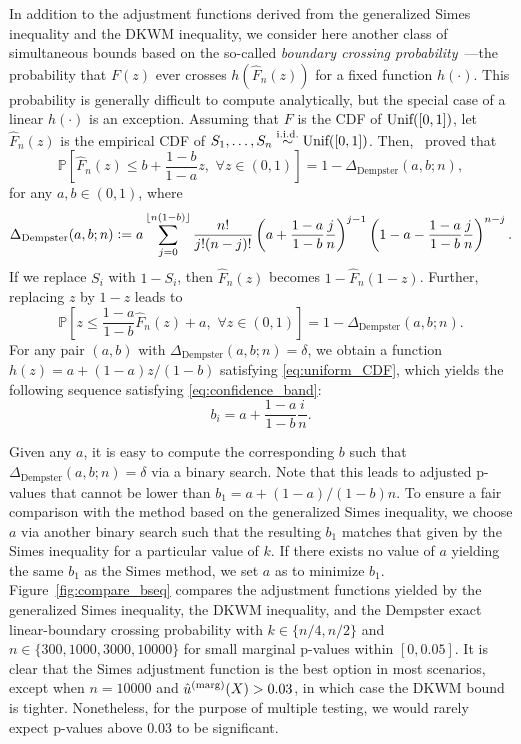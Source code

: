 \documentclass[11pt]{article}
\newcommand{\defeq}{\vcentcolon=}
\newcommand{\Unif}{\textnormal{Unif}}
\def\marg{\textnormal{(marg)}}
\renewcommand{\P}{\mathbb{P}}
\begin{document}
In addition to the adjustment functions derived from the generalized Simes inequality and the DKWM inequality, we consider here another class of simultaneous bounds based on the so-called \emph{boundary crossing probability}~\cite{dempster1959generalized, durbin1973distribution, kotel1983computing, siegmund1986boundary}---the probability that $F(z)$ ever crosses $h(\hat{F}_{n}(z))$ for a fixed function $h(\cdot)$. This probability is generally difficult to compute analytically, but the special case of a linear $h(\cdot)$ is an exception.
Assuming that $F$ is the CDF of $\Unif([0, 1])$, let $\hat{F}_{n}(z)$ is the empirical CDF of $S_{1}, \ldots, S_{n}\stackrel{\mathrm{i.i.d.}}{\sim}\Unif([0, 1])$. Then,~\cite{dempster1959generalized} proved that
\begin{equation*}
  \P\left[ \hat{F}_{n}(z)\le b + \frac{1 - b}{1 - a}z, \,\, \forall z\in (0, 1)\right] = 1 - \Delta_{\mathrm{Dempster}}(a, b; n),
 \end{equation*}
 for any $a, b\in (0, 1)$, where
 \begin{equation}\label{eq:Delta_Dempster}
  \Delta_{\mathrm{Dempster}}(a, b; n) 
  \defeq a\sum_{j=0}^{\lfloor n(1 - b)\rfloor}\frac{n!}{j!(n-j)!}\left( a + \frac{1 - a}{1 - b}\frac{j}{n}\right)^{j-1}\left( 1 - a - \frac{1 - a}{1 - b}\frac{j}{n}\right)^{n-j}.
\end{equation}
 If we replace $S_i$ with $1 - S_i$, then $\hat{F}_{n}(z)$ becomes $1 - \hat{F}_{n}(1 - z)$. Further, replacing $z$ by $1 - z$ leads to
\begin{equation}  \label{eq:dempster}
  \P\left[ z \le \frac{1 - a}{1 - b}\hat{F}_{n}(z) + a, \,\, \forall z\in (0, 1)\right] = 1 - \Delta_{\mathrm{Dempster}}(a, b; n).
\end{equation}
For any pair $(a, b)$ with $\Delta_{\mathrm{Dempster}}(a, b; n) = \delta$, we obtain a function $h(z) = a + (1 - a)z / (1 - b)$ satisfying \eqref{eq:uniform_CDF}, which yields the following sequence satisfying \eqref{eq:confidence_band}:
\[b_{i} = a + \frac{1 - a}{1 - b}\frac{i}{n}.\]

Given any $a$, it is easy to compute the corresponding $b$ such that $\Delta_{\mathrm{Dempster}}(a, b; n) = \delta$ via a binary search. 
Note that this leads to adjusted p-values that cannot be lower than $b_1 = a + (1 - a) / (1 - b)n$. 
To ensure a fair comparison with the method based on the generalized Simes inequality, we choose $a$ via another binary search such that the resulting $b_1$ matches that given by the Simes inequality for a particular value of $k$.
If there exists no value of $a$ yielding the same $b_1$ as the Simes method, we set $a$ as to minimize $b_1$. 
Figure~\ref{fig:compare_bseq} compares the adjustment functions yielded by the generalized Simes inequality, the DKWM inequality, and the Dempster exact linear-boundary crossing probability with $k\in \{n/4, n/2\}$ and $n\in \{300, 1000, 3000, 10000\}$ for small marginal p-values within $[0, 0.05]$. It is clear that the Simes adjustment function is the best option in most scenarios, except when $n = 10000$ and $\hat{u}^\marg(X) > 0.03$, in which case the DKWM bound is tighter. Nonetheless, for the purpose of multiple testing, we would rarely expect  p-values above $0.03$ to be significant.
\end{document}
